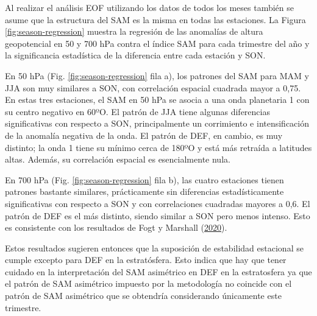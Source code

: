 \documentclass[12pt,oneside,a4paper]{reedthesis}
\begin{document}
Al realizar el análisis EOF utilizando los datos de todos los meses también se asume que la estructura del SAM es la misma en todas las estaciones.
La Figura \ref{fig:season-regression} muestra la regresión de las anomalías de altura geopotencial en 50 y 700 hPa contra el índice SAM para cada trimestre del año y la significancia estadística de la diferencia entre cada estación y SON.

En 50 hPa (Fig. \ref{fig:season-regression} fila a), los patrones del SAM para MAM y JJA son muy similares a SON, con correlación espacial cuadrada mayor a 0,75.
En estas tres estaciones, el SAM en 50 hPa se asocia a una onda planetaria 1 con su centro negativo en 60ºO.
El patrón de JJA tiene algunas diferencias significativas con respecto a SON, principalmente un corrimiento e intensificación de la anomalía negativa de la onda.
El patrón de DEF, en cambio, es muy distinto; la onda 1 tiene su mínimo cerca de 180ºO y está más retraída a latitudes altas.
Además, su correlación espacial es esencialmente nula.

En 700 hPa (Fig. \ref{fig:season-regression} fila b), las cuatro estaciones tienen patrones bastante similares, prácticamente sin diferencias estadísticamente significativas con respecto a SON y con correlaciones cuadradas mayores a 0,6.
El patrón de DEF es el más distinto, siendo similar a SON pero menos intenso.
Esto es consistente con los resultados de Fogt y Marshall (\protect\hyperlink{ref-fogt2020}{2020}).

Estos resultados sugieren entonces que la suposición de estabilidad estacional se cumple excepto para DEF en la estratósfera.
Esto indica que hay que tener cuidado en la interpretación del SAM asimétrico en DEF en la estratosfera ya que el patrón de SAM asimétrico impuesto por la metodología no coincide con el patrón de SAM asimétrico que se obtendría considerando únicamente este trimestre.
\end{document}
